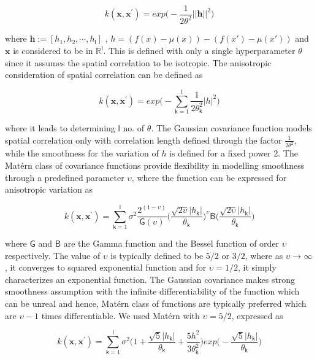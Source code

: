 \begin{equation}
 k(\bm{x},\bm{x}^{'}) = exp\bigg(-\frac{1}{2 \theta^2}||\bm{h}||^2\bigg)
\end{equation}

where $\bm h:=[h_1,h_2,\cdots,h_{\mathsf{l}}]$ , $h=(f({x})-\mu({x}))-(f({x}')-\mu({x}'))$ and $\bm x$ is considered to be in $\mathbb{R}^{\mathsf{l}}$. This is defined with only a single hyperparameter $\theta$ since it assumes the spatial correlation to be isotropic. The anisotropic consideration of spatial correlation can be defined as

\begin{equation}
 k(\bm{x},\bm{x}^{'}) = exp\bigg(-\sum_{\mathsf{k}=1}^{\mathsf{l}}\frac{1}{2\theta^2_{\mathsf{k}}}|h|^2\bigg)
\end{equation}

where it leads to determining $\mathsf{l}$ no. of $\theta$. The Gaussian covariance function models spatial correlation only with correlation length defined through the factor $\frac{1}{2\theta^2}$, while the smoothness for the variation of $h$ is defined for a fixed power $2$. The Matérn class of covariance functions provide flexibility in modelling smoothness through a predefined parameter $\upsilon$, where the function can be expressed for anisotropic variation as

\begin{equation}
 k(\bm{x},\bm{x}^{'}) = \sum_{\mathsf{k}=1}^{\mathsf{l}} \sigma^2 \frac{2^{(1-\upsilon)}}{\mathsf{G}(\upsilon)}\bigg(\frac{\sqrt{2\upsilon}|h_{\mathsf{k}}|}{\theta_{\mathsf{k}}}\bigg)^{\upsilon} \mathsf{B}\bigg(\frac{\sqrt{2\upsilon}|h_{\mathsf{k}}|}{\theta_{\mathsf{k}}}\bigg)
\end{equation}

where $\mathsf{G}$ and $\mathsf{B}$ are the Gamma function and the Bessel function of order $\upsilon$ respectively. The value of $\upsilon$ is typically defined to be $5/2$ or $3/2$, where as $\upsilon \rightarrow \infty$, it converges to squared exponential function and for $\upsilon = 1/2$, it simply characterizes an exponential function. The Gaussian covariance makes strong smoothness assumption with the infinite differentiability of the function which can be unreal and hence, Matérn class of functions are typically preferred which are $\upsilon-1$ times differentiable. We used Matérn with $\upsilon=5/2$, expressed as

\begin{equation}
 k(\bm{x},\bm{x}^{'}) = \sum_{\mathsf{k}=1}^{\mathsf{l}} \sigma^2 \bigg( 1+\frac{\sqrt{5}|h_{\mathsf{k}}|}{\theta_{\mathsf{k}}}+\frac{5h^{2}}{3\theta_{\mathsf{k}}^2}\bigg)exp\bigg(-\frac{\sqrt{5}|h_{\mathsf{k}}|}{\theta_{\mathsf{k}}}\bigg)
\end{equation}

